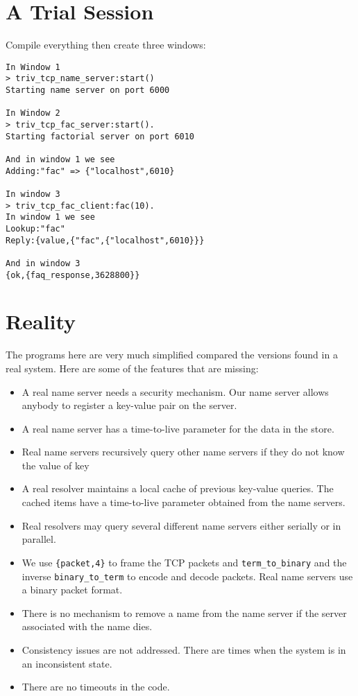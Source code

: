 \documentclass[12pt]{article}
\begin{document}
\section{A Trial Session}

Compile everything then create three windows:

\begin{Verbatim}
In Window 1
> triv_tcp_name_server:start()
Starting name server on port 6000

In Window 2
> triv_tcp_fac_server:start().
Starting factorial server on port 6010

And in window 1 we see
Adding:"fac" => {"localhost",6010}

In window 3
> triv_tcp_fac_client:fac(10).
In window 1 we see
Lookup:"fac"
Reply:{value,{"fac",{"localhost",6010}}}

And in window 3
{ok,{faq_response,3628800}}
\end{Verbatim}

\section{Reality}

The programs here are very much simplified compared the  versions found in
a real system. Here are some of the features that are missing:

\begin{itemize}
\item A real name server needs a security mechanism. Our name server allows
anybody to register a key-value pair on the server.

\item A real name server has a time-to-live parameter for the data in the store.

\item Real name servers recursively query other name servers if they do not know
the value of key

\item A real resolver maintains a local cache of previous key-value queries. The
cached items have a time-to-live parameter obtained from the name servers.

\item Real resolvers may query several different name servers either
serially or in parallel.

\item We use \verb+{packet,4}+ to frame the TCP packets and
  \verb+term_to_binary+ and the inverse \verb+binary_to_term+ to
  encode and decode packets. Real name servers use a binary packet
  format.

\item There is no mechanism to remove a name from the name server if the
  server associated with the name dies.

\item Consistency issues are not addressed. There are times when the 
system is in an inconsistent state.

\item There are no timeouts in the code.


\end{itemize}
\end{document}
